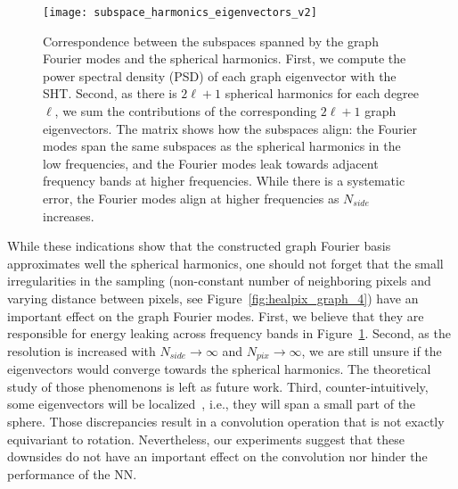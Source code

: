 \documentclass[final,twocolumn,3p,times,sort&compress]{elsarticle}
\newcommand{\figref}[1]{Figure~\ref{fig:#1}}
\renewcommand{\b}[1]{{\bm{#1}}}   %
\newcommand{\1}{\b{1}}              %
\newcommand{\0}{\b{0}}              %
\begin{document}
\begin{figure}[t!]
	\centering
	\texttt{[image: subspace\_harmonics\_eigenvectors\_v2]}
	\caption{Correspondence between the subspaces spanned by the graph Fourier modes and the spherical harmonics.
		First, we compute the power spectral density (PSD) of each graph eigenvector with the SHT.
		Second, as there is $2\ell+1$ spherical harmonics for each degree $\ell$, we sum the contributions of the corresponding $2\ell+1$ graph eigenvectors.
		The matrix shows how the subspaces align: the Fourier modes span the same subspaces as the spherical harmonics in the low frequencies, and the Fourier modes leak towards adjacent frequency bands at higher frequencies.
		While there is a systematic error, the Fourier modes align at higher frequencies as $N_{side}$ increases.}
		\label{fig:subspace_harmonics_eigenvectors}
\end{figure}

While these indications show that the constructed graph Fourier basis approximates well the spherical harmonics, one should not forget that the small irregularities in the sampling (non-constant number of neighboring pixels and varying distance between pixels, see \figref{healpix_graph_4}) have an important effect on the graph Fourier modes.
First, we believe that they are responsible for energy leaking across frequency bands in \figref{subspace_harmonics_eigenvectors}.
Second, as the resolution is increased with $N_{side} \rightarrow \infty$ and $N_{pix} \rightarrow \infty$, we are still unsure if the eigenvectors would converge towards the spherical harmonics.
The theoretical study of those phenomenons is left as future work.
Third, counter-intuitively, some eigenvectors will be localized~\citep{perraudin2018global}, i.e., they will span a small part of the sphere.
Those discrepancies result in a convolution operation that is not exactly equivariant to rotation.
Nevertheless, our experiments suggest that these downsides do not have an important effect on the convolution nor hinder the performance of the NN.
\end{document}
